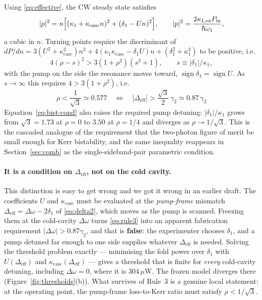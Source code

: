\documentclass[11pt,a4paper]{article}
\newcommand{\Dom}{\Delta\omega}
\newcommand{\kcasc}{\kappa_{\text{casc}}}
\begin{document}
Using \eqref{eq:effective}, the CW steady state satisfies
\begin{equation}
  |p|^2=n\Bigl[(\kappa_1+\kcasc n)^2+(\delta_1-U n)^2\Bigr],
  \qquad |p|^2=\frac{2\kappa_{1,\text{ex}}P_{\text{in}}}{\hbar\omega_1},
  \label{eq:cubic}
\end{equation}
a cubic in $n$.  Turning points require the discriminant of
$dP/dn=3(U^2+\kcasc^2)n^2+4(\kappa_1\kcasc-\delta_1U)n+(\delta_1^2+\kappa_1^2)$
to be positive, i.e.
\begin{equation}
  4(\rho-s)^2>3(1+\rho^2)(s^2+1),\qquad s\equiv|\delta_1|/\kappa_1 ,
  \label{eq:bist-cond}
\end{equation}
with the pump on the side the resonance moves toward,
$\operatorname{sign}\delta_1=\operatorname{sign}U$.  As $s\to\infty$ this
requires $4>3(1+\rho^2)$, i.e.
\begin{equation}
  \boxed{\;\rho<\frac{1}{\sqrt3}\simeq0.577
   \quad\Longleftrightarrow\quad
   |\Delta_{\text{eff}}|>\frac{\sqrt3}{2}\,\gamma_2\simeq0.87\,\gamma_2\;}
  \label{eq:rule3}
\end{equation}
Equation~\eqref{eq:bist-cond} also raises the required pump detuning:
$|\delta_1|/\kappa_1$ grows from $\sqrt3=1.73$ at $\rho=0$ to $3.50$ at
$\rho=1/4$ and diverges as $\rho\to1/\sqrt3$.  This is the cascaded
analogue of the requirement that the two-photon figure of merit be small
enough for Kerr bistability, and the same inequality reappears in
Section~\ref{sec:comb} as the single-sideband-pair parametric condition.

\paragraph{It is a condition on $\Delta_{\text{eff}}$, not on the cold
cavity.}  This distinction is easy to get wrong and we got it wrong in
an earlier draft.  The coefficients $U$ and $\kcasc$ must be evaluated
at the \emph{pump-frame} mismatch $\Delta_{\text{eff}}=\Dom-2\delta_1$
of \eqref{eq:delta2}, which moves as the pump is scanned.  Freezing them
at the cold-cavity $\Dom$ turns \eqref{eq:rule3} into an apparent
fabrication requirement $|\Dom|>0.87\gamma_2$, and that is
\textbf{false}: the experimenter chooses $\delta_1$, and a pump detuned
far enough to one side supplies whatever $\Delta_{\text{eff}}$ is needed.
Solving the threshold problem exactly --- minimising the fold power over
$\delta_1$ with $U(\Delta_{\text{eff}})$ and $\kcasc(\Delta_{\text{eff}})$
--- gives a threshold that is finite for \emph{every} cold-cavity
detuning, including $\Dom=0$, where it is $304\,\mu$W.  The frozen model
diverges there (Figure~\ref{fig:thresholds}(b)).  What survives of
Rule~3 is a genuine local statement: at the operating point, the
pump-frame loss-to-Kerr ratio must satisfy $\rho<1/\sqrt3$.
\end{document}
